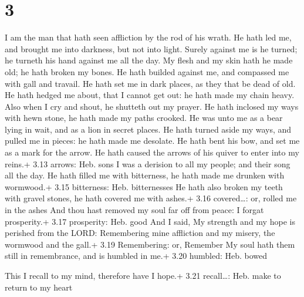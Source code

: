 \hypertarget{section-2}{%
\section{3}\label{section-2}}

 I am the man that hath seen affliction by the rod of his
wrath.  He hath led me, and brought me into darkness, but
not into light.  Surely against me is he turned; he turneth
his hand against me all the day.  My flesh and my skin hath
he made old; he hath broken my bones.  He hath builded
against me, and compassed me with gall and travail.  He hath
set me in dark places, as they that be dead of old.  He hath
hedged me about, that I cannot get out: he hath made my chain heavy.
 Also when I cry and shout, he shutteth out my prayer.
 He hath inclosed my ways with hewn stone, he hath made my
paths crooked.  He was unto me as a bear lying in wait, and
as a lion in secret places.  He hath turned aside my ways,
and pulled me in pieces: he hath made me desolate.  He hath
bent his bow, and set me as a mark for the arrow.  He hath
caused the arrows of his quiver to enter into my reins.+ 3.13 arrows:
Heb. sons  I was a derision to all my people; and their
song all the day.  He hath filled me with bitterness, he
hath made me drunken with wormwood.+ 3.15 bitterness: Heb. bitternesses
 He hath also broken my teeth with gravel stones, he hath
covered me with ashes.+ 3.16 covered\ldots: or, rolled me in the ashes
 And thou hast removed my soul far off from peace: I forgat
prosperity.+ 3.17 prosperity: Heb. good  And I said, My
strength and my hope is perished from the LORD: 
Remembering mine affliction and my misery, the wormwood and the gall.+
3.19 Remembering: or, Remember  My soul hath them still in
remembrance, and is humbled in me.+ 3.20 humbled: Heb. bowed

 This I recall to my mind, therefore have I hope.+ 3.21
recall\ldots: Heb. make to return to my heart

